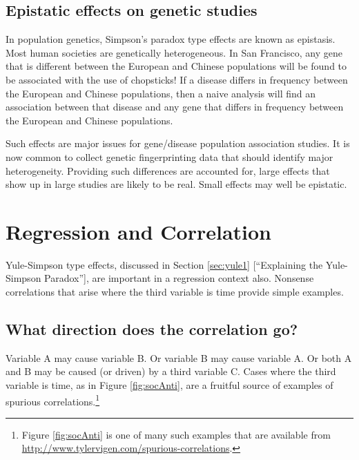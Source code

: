 \documentclass[
  10pt,
  b5paper]{book}
\begin{document}
\hypertarget{epistatic-effects-on-genetic-studies}{%
\section{Epistatic effects on genetic studies}\label{epistatic-effects-on-genetic-studies}}

In population genetics, Simpson's paradox type effects are known as
epistasis. Most human societies are genetically heterogeneous. In
San Francisco, any gene that is different between the European and
Chinese populations will be found to be associated with the use of
chopsticks! If a disease differs in frequency between the European
and Chinese populations, then a naive analysis will find an
association between that disease and any gene that differs in
frequency between the European and Chinese populations.

Such effects are major issues for gene/disease population
association studies. It is now common to collect genetic
fingerprinting data that should identify major heterogeneity.
Providing such differences are accounted for, large effects that show
up in large studies are likely to be real. Small effects may well be
epistatic.

\hypertarget{sec:reg}{%
\chapter{Regression and Correlation}\label{sec:reg}}

Yule-Simpson type effects, discussed in Section \ref{sec:yule1}
{[}``Explaining the Yule-Simpson Paradox''{]}, are important in a
regression context also. Nonsense correlations that arise
where the third variable is time provide simple examples.

\hypertarget{what-direction-does-the-correlation-go}{%
\section{What direction does the correlation go?}\label{what-direction-does-the-correlation-go}}

Variable A may cause variable B. Or variable B may cause
variable A. Or both A and B may be caused (or driven) by
a third variable C. Cases where the third variable is time,
as in Figure \ref{fig:socAnti}, are a fruitful source
of examples of spurious correlations.\footnote{Figure \ref{fig:socAnti}
  is one of many such examples that are available from\\
  \url{http://www.tylervigen.com/spurious-correlations}.}
\end{document}
